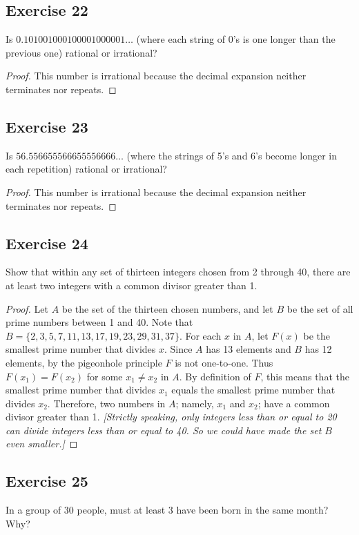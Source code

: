 \documentclass[14pt]{extarticle}
\begin{document}
\subsection{Exercise 22}
Is \(0.101001000100001000001 \ldots\) (where each string of 0’s is one longer than the previous one) rational or 
irrational?

\begin{proof}
This number is irrational because the decimal expansion neither terminates nor repeats.
\end{proof}

\subsection{Exercise 23}
Is \(56.556655566655556666 \ldots\)  (where the strings of 5’s and 6’s become longer in each repetition) rational or 
irrational?

\begin{proof}
This number is irrational because the decimal expansion neither terminates nor repeats.
\end{proof}

\subsection{Exercise 24}
Show that within any set of thirteen integers chosen from 2 through 40, there are at least two integers with a common 
divisor greater than 1.

\begin{proof}
Let \(A\) be the set of the thirteen chosen numbers, and let \(B\) be the set of all prime numbers between 1 and 40. 
Note that \(B = \{2, 3, 5, 7, 11, 13, 17, 19, 23, 29, 31, 37\}\). For each \(x\) in \(A\), let \(F(x)\) be the 
smallest prime number that divides \(x\). Since \(A\) has 13 elements and \(B\) has 12 elements, by the pigeonhole 
principle \(F\) is not one-to-one. Thus \(F(x_1) = F(x_2)\) for some \(x_1 \neq x_2\) in \(A\). By definition of \(F\), 
this means that the smallest prime number that divides \(x_1\) equals the smallest prime number that divides 
\(x_2\). Therefore, two numbers in \(A\); namely, \(x_1\) and \(x_2\); have a common divisor greater than 1. 
{\it [Strictly speaking, only integers less than or equal to 20 can divide integers less than or equal to 40. So we 
could have made the set \(B\) even smaller.]}
\end{proof}

\subsection{Exercise 25}
In a group of 30 people, must at least 3 have been born in the same month? Why?
\end{document}

